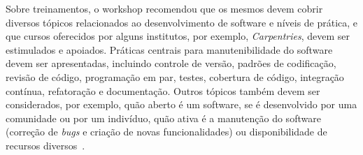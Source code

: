Sobre treinamentos, o workshop recomendou que os mesmos devem cobrir diversos tópicos relacionados ao desenvolvimento de software e níveis de prática, e que cursos oferecidos por alguns institutos, por exemplo, \textit{Carpentries}, devem ser estimulados e apoiados.
%
Práticas centrais para manutenibilidade do software devem ser apresentadas, incluindo controle de versão, padrões de codificação, revisão de código, programação em par, testes, cobertura de código, integração contínua, refatoração e documentação. 
%
Outros tópicos também devem ser considerados, por exemplo, quão aberto é um software, se é desenvolvido por uma comunidade ou por um indivíduo, quão ativa é a manutenção do software (correção de \textit{bugs} e criação de novas funcionalidades) ou disponibilidade de recursos diversos~\cite{sufi_report_2020}.

%
